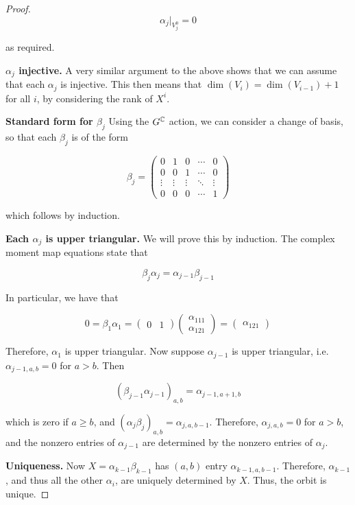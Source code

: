 \documentclass{article}
\begin{document}
\begin{proof}
    \[\alpha_j\vert_{V_j^0} = 0\]

    as required.

    \textbf{\(\alpha_j\) injective.} A very similar argument to the above shows that we can assume that each \(\alpha_j\) is injective. This then means that \(\dim(V_i) = \dim(V_{i-1}) + 1\) for all \(i\), by considering the rank of \(X^i\).

    \textbf{Standard form for \(\beta_j\)} Using the \(G^{\mathbb{C}}\) action, we can consider a change of basis, so that each \(\beta_j\) is of the form

    \[\beta_j = \begin{pmatrix}
        0 & 1 & 0 & \cdots & 0 \\
        0 & 0 & 1 & \cdots & 0 \\
        \vdots & \vdots & \vdots & \ddots & \vdots \\
        0 & 0 & 0 & \cdots & 1
    \end{pmatrix}\]

    which follows by induction.

    \textbf{Each \(\alpha_j\) is upper triangular.} We will prove this by induction. The complex moment map equations state that

    \[\beta_j\alpha_j = \alpha_{j-1}\beta_{j-1}\]

    In particular, we have that

    \[0 = \beta_1\alpha_1 = \begin{pmatrix}
        0 & 1
    \end{pmatrix}\begin{pmatrix}
        \alpha_{111} \\ \alpha_{121}
    \end{pmatrix} = \begin{pmatrix}
        \alpha_{121}
    \end{pmatrix}\]

    Therefore, \(\alpha_1\) is upper triangular. Now suppose \(\alpha_{j-1}\) is upper triangular, i.e. \(\alpha_{j-1,a,b} = 0\) for \(a > b\). Then

    \[(\beta_{j-1}\alpha_{j-1})_{a,b} = \alpha_{j-1, a+1, b}\]

    which is zero if \(a \ge b\), and \((\alpha_j\beta_j)_{a, b} = \alpha_{j, a, b-1}\). Therefore, \(\alpha_{j, a, b} = 0\) for \(a > b\), and the nonzero entries of \(\alpha_{j-1}\) are determined by the nonzero entries of \(\alpha_j\). 
    
    \textbf{Uniqueness.} Now \(X = \alpha_{k-1}\beta_{k-1}\) has \((a, b)\) entry \(\alpha_{k-1, a, b-1}\). Therefore, \(\alpha_{k-1}\), and thus all the other \(\alpha_i\), are uniquely determined by \(X\). Thus, the orbit is unique.


\end{proof}
\end{document}
